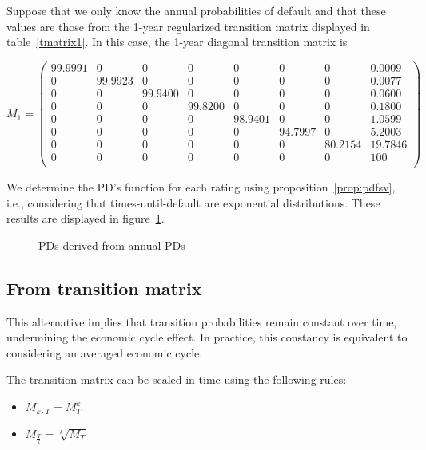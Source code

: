 \documentclass[11pt,fleqn]{book} %
\begin{document}
\begin{example}
	\label{ex:pdfsv}
	Suppose that we only know the annual probabilities of default and that these 
	values are those from the 1-year regularized transition matrix displayed in
	table~\ref{tmatrix1}. In this case, the 1-year diagonal transition matrix 
	is
	{\small
	\begin{displaymath}
		M_1 = \left(
		\begin{array}{cccccccc}
			99.9991 & 0 & 0 & 0 & 0 & 0 & 0 & 0.0009 \\
			0 & 99.9923 & 0 & 0 & 0 & 0 & 0 & 0.0077 \\
			0 & 0 & 99.9400 & 0 & 0 & 0 & 0 & 0.0600 \\
			0 & 0 & 0 & 99.8200 & 0 & 0 & 0 & 0.1800 \\
			0 & 0 & 0 & 0 & 98.9401 & 0 & 0 & 1.0599 \\
			0 & 0 & 0 & 0 & 0 & 94.7997 & 0 & 5.2003 \\
			0 & 0 & 0 & 0 & 0 & 0 & 80.2154 & 19.7846 \\
			0 & 0 & 0 & 0 & 0 & 0 & 0 & 100 \\
		\end{array}
		\right)
	\end{displaymath}\par}
	We determine the PD's function for each rating using  
	proposition~\ref{prop:pdfsv}, i.e., considering that times-until-default
	are exponential distributions. These results are displayed in 
	figure~\ref{fig:pdfsv}. 
\end{example}

\begin{figure}[!ht]
	\centering
	\caption{PDs derived from annual PDs}
	\label{fig:pdfsv}
\end{figure}

\subsection{From transition matrix}
\label{pdftm}

This alternative implies that transition probabilities remain constant
over time, undermining the economic cycle effect. In practice, this constancy
is equivalent to considering an averaged economic cycle.

\begin{proposition}
	The transition matrix can be scaled in time using the following rules:
	\begin{itemize}
		\item $M_{k \cdot T} = M_{T}^k$
		\item $M_{\frac{T}{k}} = \sqrt[k]{M_{T}}$
	\end{itemize}
\end{proposition}
\end{document}

